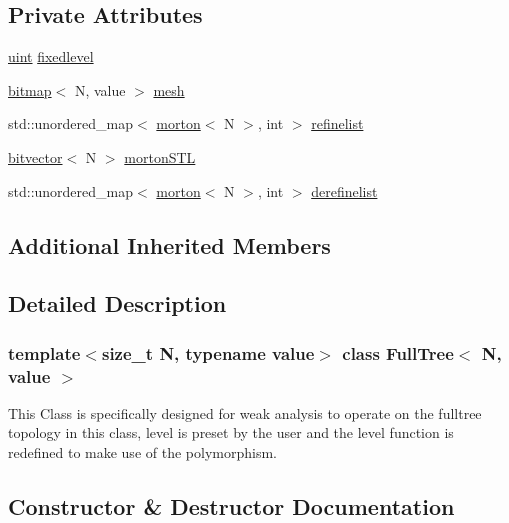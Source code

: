 \subsection*{Private Attributes}
\begin{DoxyCompactItemize}
\item 
\mbox{\hyperlink{definitions_8h_a69aa29b598b851b0640aa225a9e5d61d}{uint}} \mbox{\hyperlink{classFullTree_a1bcc4d0daf8ad12569054422379b556f}{fixedlevel}}
\item 
\mbox{\hyperlink{definitions_8h_acf2396ef4de9eb8a6324b9f1a624ea85}{bitmap}}$<$ N, value $>$ \mbox{\hyperlink{classFullTree_a98c8b05985b0cf911db0d6252aa98396}{mesh}}
\item 
std\+::unordered\+\_\+map$<$ \mbox{\hyperlink{definitions_8h_af8682350bd8bb38ee9023f7a0a310add}{morton}}$<$ N $>$, int $>$ \mbox{\hyperlink{classFullTree_aa4cfcbc1c6029ecd353759159a8d8844}{refinelist}}
\item 
\mbox{\hyperlink{definitions_8h_a55821d7929f3f16aaf1466129c209492}{bitvector}}$<$ N $>$ \mbox{\hyperlink{classFullTree_a91af9d7a974af6484dc61c20cd78d1bc}{morton\+S\+TL}}
\item 
std\+::unordered\+\_\+map$<$ \mbox{\hyperlink{definitions_8h_af8682350bd8bb38ee9023f7a0a310add}{morton}}$<$ N $>$, int $>$ \mbox{\hyperlink{classFullTree_a4c87e86cce1c7f0f92651ad87d3823ec}{derefinelist}}
\end{DoxyCompactItemize}
\subsection*{Additional Inherited Members}


\subsection{Detailed Description}
\subsubsection*{template$<$size\+\_\+t N, typename value$>$\newline
class Full\+Tree$<$ N, value $>$}

This Class is specifically designed for weak analysis to operate on the fulltree topology in this class, level is preset by the user and the level function is redefined to make use of the polymorphism. 

\subsection{Constructor \& Destructor Documentation}
\mbox{\label{classFullTree_a7e91df045a1e04bb4d749d67300a1c3b}} 
